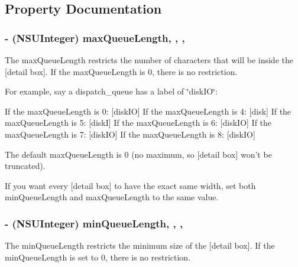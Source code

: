 \subsection{Property Documentation}
\hypertarget{interface_dispatch_queue_log_formatter_a1e1ab3c930af717004b7cc9bd318895c}{
\subsubsection[{max\-Queue\-Length}]{\setlength{\rightskip}{0pt plus 5cm}-\/ (N\-S\-U\-Integer) max\-Queue\-Length\hspace{0.3cm}{\ttfamily [read]}, {\ttfamily [write]}, {\ttfamily [atomic]}, {\ttfamily [assign]}}}\label{interface_dispatch_queue_log_formatter_a1e1ab3c930af717004b7cc9bd318895c}
The max\-Queue\-Length restricts the number of characters that will be inside the \mbox{[}detail box\mbox{]}. If the max\-Queue\-Length is 0, there is no restriction.

For example, say a dispatch\-\_\-queue has a label of \char`\"{}disk\-I\-O\char`\"{}\-:

If the max\-Queue\-Length is 0\-: \mbox{[}disk\-I\-O\mbox{]} If the max\-Queue\-Length is 4\-: \mbox{[}disk\mbox{]} If the max\-Queue\-Length is 5\-: \mbox{[}disk\-I\mbox{]} If the max\-Queue\-Length is 6\-: \mbox{[}disk\-I\-O\mbox{]} If the max\-Queue\-Length is 7\-: \mbox{[}disk\-I\-O\mbox{]} If the max\-Queue\-Length is 8\-: \mbox{[}disk\-I\-O\mbox{]}

The default max\-Queue\-Length is 0 (no maximum, so \mbox{[}detail box\mbox{]} won't be truncated).

If you want every \mbox{[}detail box\mbox{]} to have the exact same width, set both min\-Queue\-Length and max\-Queue\-Length to the same value. \hypertarget{interface_dispatch_queue_log_formatter_a8c5f43add80afe358b5728c2b5f3fa8a}{
\subsubsection[{min\-Queue\-Length}]{\setlength{\rightskip}{0pt plus 5cm}-\/ (N\-S\-U\-Integer) min\-Queue\-Length\hspace{0.3cm}{\ttfamily [read]}, {\ttfamily [write]}, {\ttfamily [atomic]}, {\ttfamily [assign]}}}\label{interface_dispatch_queue_log_formatter_a8c5f43add80afe358b5728c2b5f3fa8a}
The min\-Queue\-Length restricts the minimum size of the \mbox{[}detail box\mbox{]}. If the min\-Queue\-Length is set to 0, there is no restriction.

